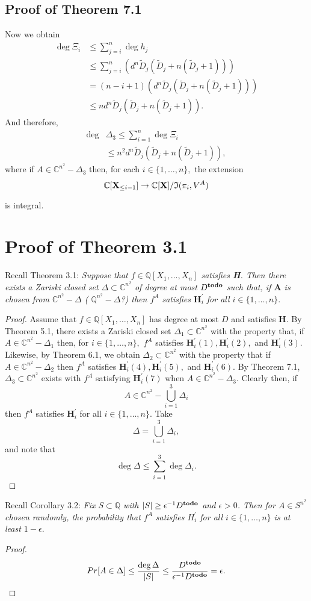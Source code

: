 \documentclass[sigconf]{acmart}
\def\td{{\bf todo}}
\def\C{\mathbb{C}}
\def\Q{\mathbb{Q}}
\def\Dt{\widetilde{D}}
\def\D{\Delta}
\begin{document}
\subsection{Proof of Theorem 7.1}
%
Now we obtain
%
\begin{align*}
    \deg \Xi_i 
    &\leq \sum_{j=i}^n \deg h_j\\
    &\leq  \sum_{j=i}^n \left( d^n\Dt_j\left(\Dt_j + n\left(\Dt_j+1\right) \right) \right) \\
    &=  (n-i+1)\left( d^n\Dt_j\left(\Dt_j + n\left(\Dt_j+1\right) \right) \right)\\
    &\leq  n d^n\Dt_j\left(\Dt_j + n\left(\Dt_j+1\right) \right) .
\end{align*}
%
And therefore,  
%
\begin{align*}
    \deg& \Delta_3 \leq \sum_{i=1}^n \deg \Xi_i\\
    &\leq n^2 d^n\Dt_j\left(\Dt_j + n\left(\Dt_j+1\right) \right),
\end{align*}
%
where if $A \in \C^{n^2} - \Delta_3$ then, for each $i \in \{1,\hdots,n\},$ the extension 
\[
\C[\textbf{X}_{\leq i-1}]\rightarrow\C[\textbf{X}]/\frak{I}(\pi_i,V^A)
\]

is integral.
%
%
%
%
\section{Proof of Theorem 3.1}
%
Recall Theorem 3.1: \textit{Suppose that $f \in \Q[X_1,\hdots,X_n]$ satisfies \textbf{H}. Then there exists a Zariski closed set $\D \subset \mathbb{C}^{n^2}$ of degree at most $D^{\textrm{\td}}$ such that, if $\textbf{A}$ is chosen from  $\C^{n^2}-\Delta$ ( $\Q^{n^2}-\Delta$?) then $f^A$ satisfies $\textbf{H}_i^{'}$ for all $i \in \{1,\hdots,n\}.$} 
%
\begin{proof}
Assume that $f\in \Q[X_1,\hdots,X_n]$ has degree at most $D$ and satisfies $\textbf{H}.$ By Theorem 5.1, there exists a Zariski closed set $\D_1\subset \C^{n^2}$ with the property that, if $A \in \C^{n^2}-\D_1$ then, for $i \in \{1,\hdots,n\},$ $f^A$ satisfies $\textbf{H}_i^{'}(1), \textbf{H}_i^{'}(2),$ and $\textbf{H}_i^{'}(3).$ Likewise, by Theorem 6.1, we obtain $\D_2 \subset \C^{n^2}$ with the property that if $A \in \C^{n^2}-\D_2$ then $f^A$ satisfies $\textbf{H}_i^{'}(4), \textbf{H}_i^{'}(5),$ and $\textbf{H}_i^{'}(6).$ By Theorem 7.1, $\D_3 \subset \C^{n^2}$ exists with $f^A$ satisfying $\textbf{H}_i^{'}(7)$ when $A \in \C^{n^2}-\D_3$. Clearly then, if 
\[
A \in \C^{n^2} - \bigcup_{i=1}^3 \D_i
\]
then $f^A$ satisfies  $\textbf{H}_i^{'}$ for all $i \in \{1,\hdots,n\}.$ Take 
\[
\Delta = \bigcup_{i=1}^3 \D_i,
\]
and note that 
\[
\deg \D \leq  \sum_{i=1}^3 \deg \D_i.
\]
\end{proof}
%
Recall Corollary 3.2: \textit{Fix $S \subset \mathbb{Q}$ with $|S| \geq \epsilon^{-1} D^{\textrm{\td}}$ and $\epsilon > 0$. Then for $A\in S^{n^2}$ chosen randomly, the probability that $f^A$ satisfies $H_i^{'}$ for all $i \in \{1,\hdots,n\}$ is at least $1-\epsilon.$}
%
\begin{proof}
\[
Pr[A \in \Delta] \leq \frac{\deg \Delta}{|S|} \leq \frac{D^{\td}}{\epsilon^{-1}D^{\td}} = \epsilon.
\]
\end{proof}
%
%
%
%
\end{document}
